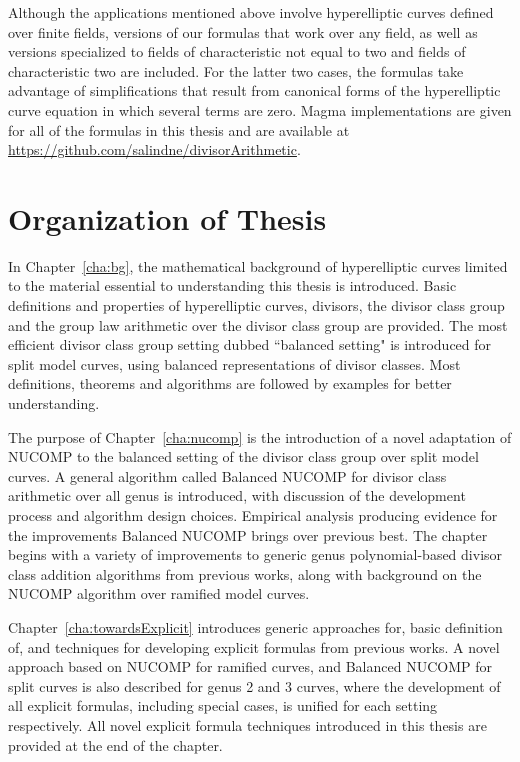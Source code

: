 Although the applications mentioned above involve hyperelliptic curves defined
over finite fields, versions of our formulas that work over any field, as well
as versions specialized to fields of characteristic not equal to two and fields
of characteristic two are included. For the latter two cases, the  formulas take
advantage of simplifications that result from canonical forms of the
hyperelliptic curve equation in which several terms are zero. Magma
implementations are given for all of the formulas in this thesis and are
available at \url{https://github.com/salindne/divisorArithmetic}. 


\section{Organization of Thesis}
In Chapter~\ref{cha:bg}, the mathematical background of hyperelliptic curves
limited to the material essential to understanding this thesis is introduced.
Basic definitions and properties of hyperelliptic curves, divisors, the divisor
class group and the group law arithmetic over the divisor class group are
provided. The most efficient divisor class group setting dubbed ``balanced
setting" is introduced for split model curves, using balanced representations of
divisor classes. Most definitions, theorems and algorithms are followed by
examples for better understanding.

The purpose of Chapter~\ref{cha:nucomp} is the introduction of a novel
adaptation of NUCOMP to the balanced setting of the divisor class group over
split model curves. A general algorithm called Balanced NUCOMP for divisor class
arithmetic over all genus is introduced, with discussion of the development
process and algorithm design choices. Empirical analysis producing evidence for
the improvements Balanced NUCOMP brings over previous best. The chapter begins
with a variety of improvements to generic genus polynomial-based divisor class
addition algorithms from previous works, along with background on the NUCOMP
algorithm over ramified model curves.

Chapter~\ref{cha:towardsExplicit} introduces generic approaches for, basic
definition of, and techniques for developing explicit formulas from previous works.
A novel approach based on NUCOMP for ramified curves, and Balanced NUCOMP for
split curves is also described for genus 2 and 3 curves, where the development of all
explicit formulas, including special cases, is unified for each setting
respectively. All novel explicit formula techniques introduced in
this thesis are provided at the end of the chapter.

